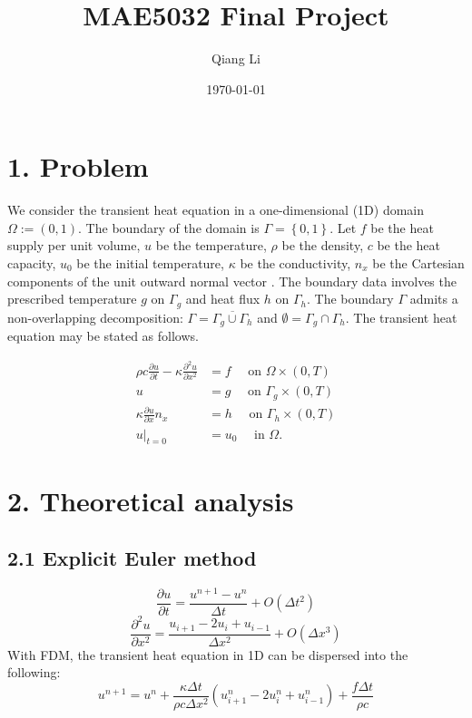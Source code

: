 \documentclass[12pt]{article}
\begin{document}
\title{\bf MAE5032 Final Project}
\author{Qiang Li}
\date{\today}
\maketitle

\section*{1. Problem}
We consider the transient heat equation in a one-dimensional (1D) domain $\Omega := (0,1)$. The boundary of the domain is $\Gamma = \left\lbrace 0, 1 \right\rbrace$.
Let $f$ be the heat supply per unit volume, $u$ be the temperature,  $\rho$ be the density, $c$ be the heat capacity, $u_0$ be the initial temperature, $\kappa$ be the conductivity, $n_x$ be the Cartesian components of the unit outward normal vector . The boundary data involves the prescribed temperature $g$ on $\Gamma_g$ and heat flux $h$ on $\Gamma_h$. The boundary $\Gamma$ admits a non-overlapping decomposition: $\Gamma = \overline{\Gamma_{g} \cup \Gamma_h}$ and $\emptyset = \Gamma_g \cap \Gamma_h$. The transient heat equation may be stated as follows.

\begin{align*}
\rho c \frac{\partial u}{\partial t} - \kappa  \frac{\partial^2 u}{\partial x^2} &= f \quad \mbox{ on } \Omega \times (0,T) \\
u &= g \quad \mbox{ on } \Gamma_{g} \times (0,T) \\
\kappa \frac{\partial u}{\partial x} n_{x}  &= h \quad \mbox{ on } \Gamma_h \times (0,T) \\
u|_{t=0} &= u_0 \quad \mbox{ in } \Omega.
\end{align*}

\section*{2. Theoretical analysis}
\subsection*{2.1 Explicit Euler method}
\begin{equation}
    \frac{\partial u}{\partial t}=\frac{u^{n+1}-u^n}{\Delta t}+O(\Delta t^2)\label{partial time}
\end{equation}
\begin{equation}
    \frac{\partial^2 u}{\partial x^2}=\frac{u_{i+1}-2u_i+u_{i-1}}{\Delta x^2}+O(\Delta x^3)\label{partial u}
\end{equation}
With FDM, the transient heat equation in 1D can be dispersed into the following:
\begin{equation}
    u^{n+1}=u^n+\frac{\kappa\Delta t}{\rho c\Delta x^2}(u_{i+1}^n-2u_i^n+u_{i-1}^n)+\frac{f\Delta t}{\rho c}\label{3}
\end{equation}
\end{document}
